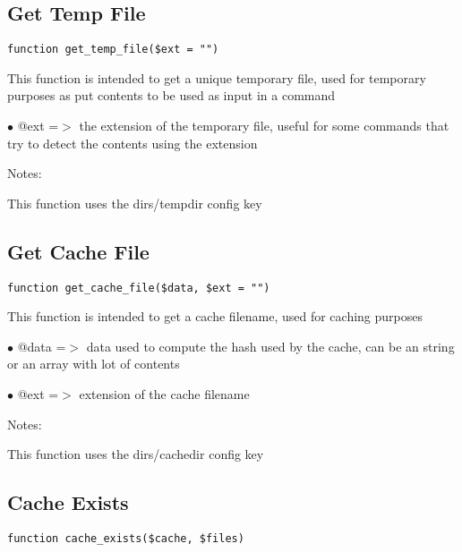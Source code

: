 \documentclass[a4paper]{book}
\begin{document}
\hypertarget{toc129}{}
\subsection{Get Temp File}

\begin{lstlisting}
function get_temp_file($ext = "")
\end{lstlisting}

This function is intended to get a unique temporary file, used for temporary
purposes as put contents to be used as input in a command

\begin{compactitem}
\item[\color{myblue}$\bullet$] @ext =$>$ the extension of the temporary file, useful for some commands that
        try to detect the contents using the extension
\end{compactitem}

Notes:

This function uses the dirs/tempdir config key

\hypertarget{toc130}{}
\subsection{Get Cache File}

\begin{lstlisting}
function get_cache_file($data, $ext = "")
\end{lstlisting}

This function is intended to get a cache filename, used for caching purposes

\begin{compactitem}
\item[\color{myblue}$\bullet$] @data =$>$ data used to compute the hash used by the cache, can be an string or
         an array with lot of contents
\item[\color{myblue}$\bullet$] @ext  =$>$ extension of the cache filename
\end{compactitem}

Notes:

This function uses the dirs/cachedir config key

\hypertarget{toc131}{}
\subsection{Cache Exists}

\begin{lstlisting}
function cache_exists($cache, $files)
\end{lstlisting}
\end{document}
